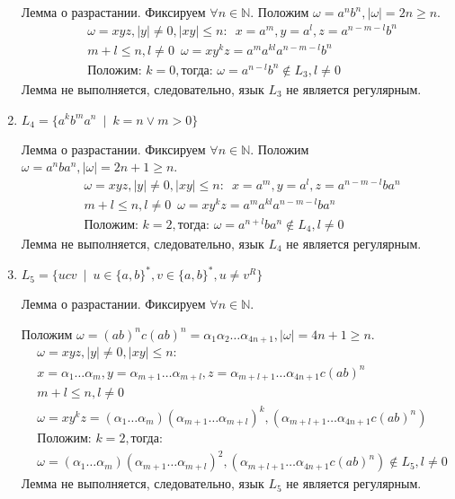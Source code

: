 \documentclass[a4paper, 12pt] {article} %
\begin{document}
\begin{enumerate}
    Лемма о разрастании. Фиксируем $\forall n \in \mathbb{N}$. Положим $\omega = a^n b^n, |\omega| = 2n \ge n$.
    \begin{align*}
        &\omega = xyz, |y| \ne 0, |xy| \le n : \enspace x = a^m, y = a^l, z = a^{n-m-l}b^n \\
        &m+l \le n, l \ne 0 \enspace \omega = xy^kz = a^{m}a^{kl}a^{n-m-l}b^n \\
        &\text{Положим: } k=0, \text{тогда: } \omega = a^{n-l}b^n \notin L_3, l \ne 0
    \end{align*}
    Лемма не выполняется, следовательно, язык $L_3$ не является регулярным. \\
    
    \item 
    $L_4 = \{a^k b^m a^n \enspace | \enspace k = n \vee m > 0\}$
    
    Лемма о разрастании. Фиксируем $\forall n \in \mathbb{N}$. Положим $\omega = a^n ba^n, |\omega| = 2n+1 \ge n$.
    \begin{align*}
        &\omega = xyz, |y| \ne 0, |xy| \le n : \enspace x = a^m, y = a^l, z = a^{n-m-l}ba^n \\
        &m+l \le n, l \ne 0 \enspace \omega = xy^kz = a^{m}a^{kl}a^{n-m-l}ba^n \\
        &\text{Положим: } k=2, \text{тогда: } \omega = a^{n+l}ba^n \notin L_4, l \ne 0
    \end{align*}
    Лемма не выполняется, следовательно, язык $L_4$ не является регулярным. \\
    
    \item 
    $L_5 = \{ucv \enspace | \enspace u \in \{a,b\}^*, v \in \{a,b\}^*, u \ne v^R\}$
    
    Лемма о разрастании. Фиксируем $\forall n \in \mathbb{N}$. 
    
    Положим $\omega = (ab)^n c(ab)^n = \alpha_1\alpha_2\dots\alpha_{4n+1}, |\omega| = 4n+1 \ge n$.
    \begin{align*}
        &\omega = xyz, |y| \ne 0, |xy| \le n : \\
        &x = \alpha_1\dots\alpha_m, y = \alpha_{m+1}\dots\alpha_{m+l}, z = \alpha_{m+l+1}\dots\alpha_{4n+1} c(ab)^n \\
        &m+l \le n, l \ne 0 \\
        &\omega = xy^kz = (\alpha_1\dots\alpha_m)(\alpha_{m+1}\dots\alpha_{m+l})^k, 
        (\alpha_{m+l+1}\dots\alpha_{4n+1} c(ab)^n) \\
        &\text{Положим: } k=2, \text{тогда: } \\
        &\omega = (\alpha_1\dots\alpha_m)(\alpha_{m+1}\dots\alpha_{m+l})^2, 
        (\alpha_{m+l+1}\dots\alpha_{4n+1} c(ab)^n) \notin L_5, l \ne 0
    \end{align*}
    Лемма не выполняется, следовательно, язык $L_5$ не является регулярным. \\
\end{enumerate}
\end{document}
